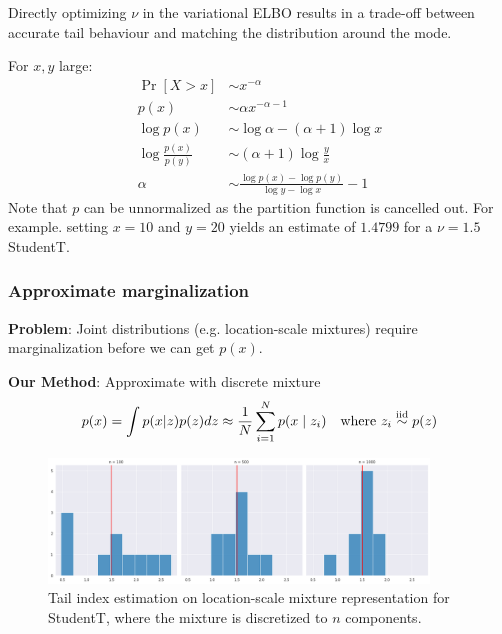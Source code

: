 \documentclass{scrartcl}
\theoremstyle{definition}
\begin{document}
Directly optimizing $\nu$ in the variational ELBO results in a trade-off between
accurate tail behaviour and matching the distribution around the mode.

For $x, y$ large:
\begin{align*}
    \Pr[X > x]             & \sim x^{-\alpha}                                       \\
    p(x)                   & \sim \alpha x^{-\alpha - 1}                            \\
    \log p(x)              & \sim \log \alpha - (\alpha + 1) \log x                 \\
    \log \frac{p(x)}{p(y)} & \sim (\alpha + 1) \log \frac{y}{x}                     \\
    \alpha                 & \sim \frac{\log p(x) - \log p(y)}{\log y - \log x} - 1
\end{align*}
Note that $p$ can be unnormalized as the partition function is cancelled out.
For example. setting $x=10$ and $y=20$ yields an estimate of $1.4799$
for a $\nu=1.5$ StudentT.


\subsubsection{Approximate marginalization}


\textbf{Problem}: Joint distributions (e.g. location-scale mixtures) require
marginalization before we can get $p(x)$.

\textbf{Our Method}: Approximate with discrete mixture
\begin{align*}
    p(x) = \int p(x|z) p(z) dz \approx \frac{1}{N} \sum_{i=1}^N p(x \mid z_i)\quad\text{where}~z_i\overset{\text{iid}}{\sim} p(z)
\end{align*}

\begin{figure}[H]
    \centering
    \includegraphics[width=0.9\textwidth]{Figures/our-estimator.png}
    \caption{Tail index estimation on location-scale mixture representation
        for StudentT, where the mixture is discretized to $n$ components.}
    \label{fig:approx_marg}
\end{figure}
\end{document}
